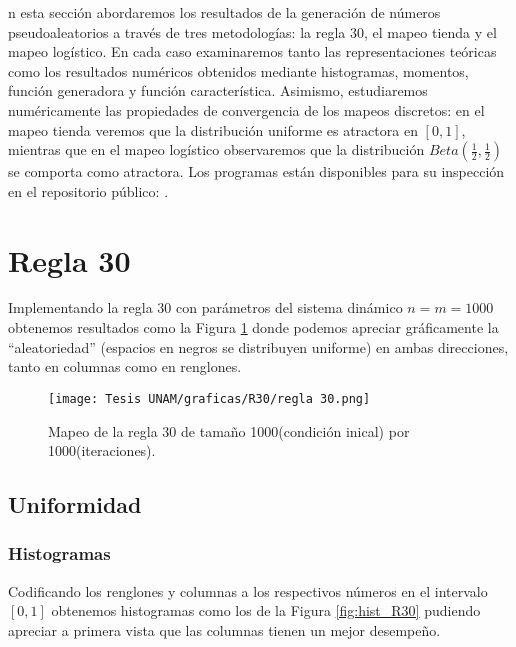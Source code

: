 \documentclass[../Main.tex]{subfiles}
\begin{document}
\MakeLowercase{n} esta sección abordaremos los resultados de la generación de números pseudoaleatorios a través de tres metodologías: la regla 30, el mapeo tienda y el mapeo logístico. En cada caso examinaremos tanto las representaciones teóricas como los resultados numéricos obtenidos mediante histogramas, momentos, función generadora y función característica. Asimismo, estudiaremos numéricamente las propiedades de convergencia de los mapeos discretos: en el mapeo tienda veremos que la distribución uniforme es atractora en $[0,1]$, mientras que en el mapeo logístico observaremos que la distribución $Beta(\tfrac{1}{2},\tfrac{1}{2})$ se comporta como atractora. Los programas están disponibles para su inspección en el repositorio público: \cite{Lince2024}.
\section{Regla 30}
Implementando la regla 30 con parámetros del sistema dinámico $n=m=1000$ 
obtenemos resultados como la Figura \ref{fig:R30} donde podemos apreciar gráficamente la ``aleatoriedad'' (espacios en negros se distribuyen uniforme) en ambas direcciones, tanto en columnas como en renglones.
\begin{figure}[h!]
    \centering
    \texttt{[image: Tesis UNAM/graficas/R30/regla 30.png]}
    \caption{Mapeo de la regla 30 de tamaño 1000(condición inical) por 1000(iteraciones).}
    \label{fig:R30}
\end{figure} 
\subsection{Uniformidad}
\subsubsection{Histogramas}
Codificando los renglones y columnas a los respectivos números en el intervalo $[0,1]$ obtenemos histogramas como los de la Figura \ref{fig:hist_R30} pudiendo apreciar a primera vista que las columnas tienen un mejor desempeño. 
\end{document}
